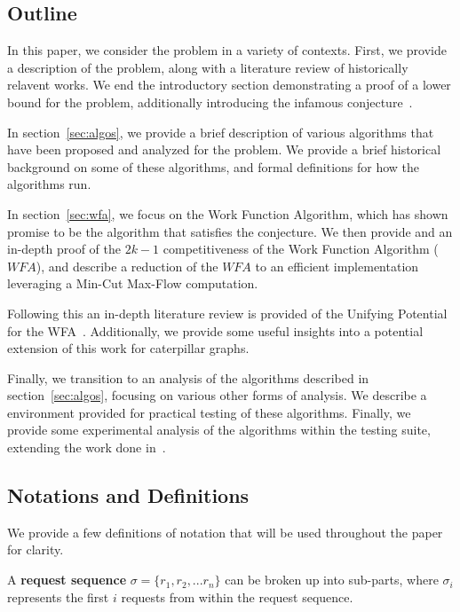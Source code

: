 \subsection{Outline}
\label{sec:out}
In this paper, we consider the \KS problem in a variety of contexts. First, we provide a description of the \KS problem, along with a literature review of historically relavent works. We end the introductory section demonstrating a proof of a lower bound for the problem, additionally introducing the infamous \KS conjecture~\cite{KS1988}. 

In section~\ref{sec:algos}, we provide a brief description of various algorithms that have been proposed and analyzed for the \KS problem. We provide a brief historical background on some of these algorithms, and formal definitions for how the algorithms run.

In section~\ref{sec:wfa}, we focus on the Work Function Algorithm, which has shown promise to be the algorithm that satisfies the \KS conjecture. We then provide and an in-depth proof of the $2k-1$ competitiveness of the Work Function Algorithm ($WFA$), and describe a reduction of the $WFA$ to an efficient implementation leveraging a Min-Cut Max-Flow computation.

Following this an in-depth literature review is provided of the Unifying Potential for the WFA~\cite{unifyingPotential2021}. Additionally, we provide some useful insights into a potential extension of this work for caterpillar graphs. 

Finally, we transition to an analysis of the algorithms described in section~\ref{sec:algos}, focusing on various other forms of analysis. We describe a \CC environment provided for practical testing of these algorithms. Finally, we provide some experimental analysis of the algorithms within the testing suite, extending the work done in~\cite{independantStudy2023}.

\subsection{Notations and Definitions}

We provide a few definitions of notation that will be used throughout the paper for clarity.

\begin{definition}
    A \textbf{request sequence} $\sigma = \{ r_1, r_2, ... r_n\}$ can be broken up into sub-parts, where $\sigma_i$ represents the first $i$ requests from within the request sequence.
\end{definition}

